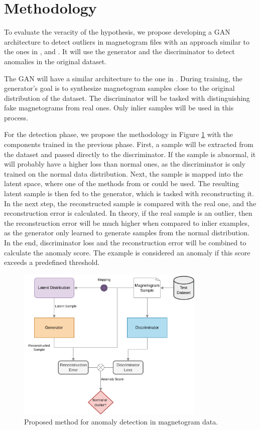 \section{Methodology}\label{sec:method}
To evaluate the veracity of the hypothesis, we propose developing a GAN architecture to detect outliers in magnetogram files with an approach similar to the ones in \cite{li.etal_MADGANMultivariateAnomaly_2019}, and \cite{bashar.nayak_TAnoGANTimeSeries_2020}. It will use the generator and the discriminator to detect anomalies in the original dataset. 

The GAN will have a similar architecture to the one in \cite{goodfellow.etal_GenerativeAdversarialNets_}. During training, the generator's goal is to synthesize magnetogram samples close to the original distribution of the dataset. The discriminator will be tasked with distinguishing fake magnetograms from real ones. Only inlier samples will be used in this process.

For the detection phase, we propose the methodology in Figure \ref{fig:proposed_gan_arch} with the components trained in the previous phase. First, a sample will be extracted from the dataset and passed directly to the discriminator. If the sample is abnormal, it will probably have a higher loss than normal ones, as the discriminator is only trained on the normal data distribution. Next, the sample is mapped into the latent space, where one of the methods from \cite{li.etal_MADGANMultivariateAnomaly_2019} or \cite{bashar.nayak_TAnoGANTimeSeries_2020} could be used. The resulting latent sample is then fed to the generator, which is tasked with reconstructing it. In the next step, the reconstructed sample is compared with the real one, and the reconstruction error is calculated. In theory, if the real sample is an outlier, then the reconstruction error will be much higher when compared to inlier examples, as the generator only learned to generate samples from the normal distribution. In the end, discriminator loss and the reconstruction error will be combined to calculate the anomaly score. The example is considered an anomaly if this score exceeds a predefined threshold.

\begin{figure}[ht]
\centering
\includegraphics[width=0.8\textwidth]{figures/proposed_gan_arch.png}
\caption{Proposed method for anomaly detection in magnetogram data.}
\label{fig:proposed_gan_arch}
\end{figure}

